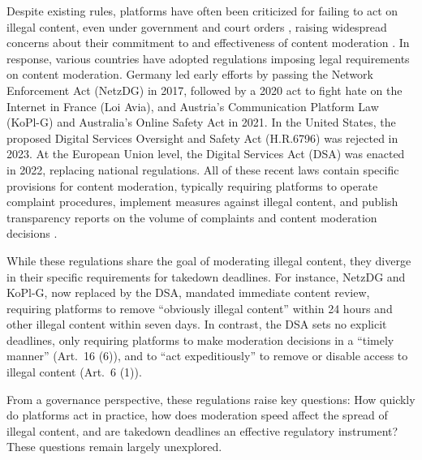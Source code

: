 \documentclass{article}
\begin{document}
Despite existing rules, platforms have often been criticized for failing to act on illegal content, even under government and court orders \cite{denardis2015internet, de2020online}, raising widespread concerns about their commitment to and effectiveness of content moderation \cite{hoffman2020liability}. 
In response, various countries have adopted regulations imposing legal requirements on content moderation. Germany led early efforts by passing the Network Enforcement Act (NetzDG) in 2017, followed by a 2020 act to fight hate on the Internet in France (Loi Avia), and Austria's Communication Platform Law (KoPl-G) and Australia's Online Safety Act in 2021. In the United States, the proposed Digital Services Oversight and Safety Act (H.R.6796) was rejected in 2023. At the European Union level, the Digital Services Act (DSA) was enacted in 2022, replacing national regulations. All of these recent laws contain specific provisions for content moderation, typically requiring platforms to operate complaint procedures, implement measures against illegal content, and publish transparency reports on the volume of complaints and content moderation decisions \cite{just2024enhancing}. 

While these regulations share the goal of moderating illegal content, they diverge in their specific requirements for takedown deadlines. For instance, NetzDG and KoPl-G, now replaced by the DSA, mandated immediate content review, requiring platforms to remove ``obviously illegal content'' within 24 hours and other illegal content within seven days. In contrast, the DSA sets no explicit deadlines, only requiring platforms to make moderation decisions in a ``timely manner'' (Art.~16 (6)), and to ``act expeditiously'' to remove or disable access to illegal content (Art.~6 (1)).

From a governance perspective, these regulations raise key questions: 
How quickly do platforms act in practice, how does moderation speed affect the spread of illegal content, and are takedown deadlines an effective regulatory instrument? 
These questions remain largely unexplored.  
\end{document}
